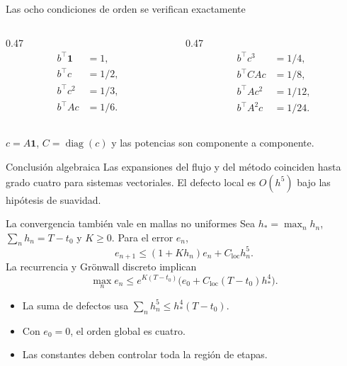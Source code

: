 \documentclass[aspectratio=169,11pt]{beamer}
\begin{document}
\begin{frame}{Las ocho condiciones de orden se verifican exactamente}
\small
\begin{columns}[T]
\begin{column}{0.47\textwidth}
\begin{align*}
b^\top\mathbf1&=1,\\
b^\top c&=1/2,\\
b^\top c^2&=1/3,\\
b^\top Ac&=1/6.
\end{align*}
\end{column}
\begin{column}{0.47\textwidth}
\begin{align*}
b^\top c^3&=1/4,\\
b^\top CAc&=1/8,\\
b^\top Ac^2&=1/12,\\
b^\top A^2c&=1/24.
\end{align*}
\end{column}
\end{columns}
\vspace{0.4cm}
$c=A\mathbf1$, $C=\operatorname{diag}(c)$ y las potencias son componente a componente.
\begin{block}{Conclusión algebraica}
Las expansiones del flujo y del método coinciden hasta grado cuatro para
sistemas vectoriales. El defecto local es $O(h^5)$ bajo las hipótesis de suavidad.
\end{block}
\end{frame}

\begin{frame}{La convergencia también vale en mallas no uniformes}
Sea $h_* =\max_n h_n$, $\sum_n h_n=T-t_0$ y $K\geq0$. Para el error $e_n$,
\[
e_{n+1}\leq (1+Kh_n)e_n+C_{\mathrm{loc}}h_n^5.
\]
La recurrencia y Grönwall discreto implican
\[
\boxed{\max_n e_n\leq e^{K(T-t_0)}
\bigl(e_0+C_{\mathrm{loc}}(T-t_0)h_*^4\bigr).}
\]
\begin{itemize}
\item La suma de defectos usa $\sum_n h_n^5\leq h_*^4(T-t_0)$.
\item Con $e_0=0$, el orden global es cuatro.
\item Las constantes deben controlar toda la región de etapas.
\end{itemize}
\end{frame}
\end{document}
